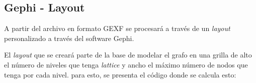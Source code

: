 \documentclass[12pt,oneside,letterpaper]{book}
\newcommand{\eng}[1]{\textit{#1}\xspace}			%
\newcommand{\abr}[1]{\textsc{#1}\xspace}           %
\theoremstyle{definition}
\begin{document}
\subsection{Gephi - Layout}
\label{sub:gephi_layout}
A partir del archivo en formato \abr{GEXF} se procesará a través de un \eng{layout} personalizado a través del software Gephi.

El \eng{layout} que se creará parte de la base de modelar el grafo en una grilla de alto el número de niveles que tenga \eng{ lattice} y ancho el máximo número de nodos que tenga por cada nivel. para esto, se presenta el código donde se calcula esto:

\lstset{
  basicstyle=\footnotesize\tt,        %
  breakatwhitespace=false,         %
  breaklines=true,                 %
  captionpos=b,                    %
  extendedchars=true,              %
  frame=single,                    %
  language=Java,                 %
  keywordstyle=\bf,
  showspaces=false,                %
  showstringspaces=false,          %
  showtabs=false,                  %
  tabsize=2                       %
}
\end{document}
